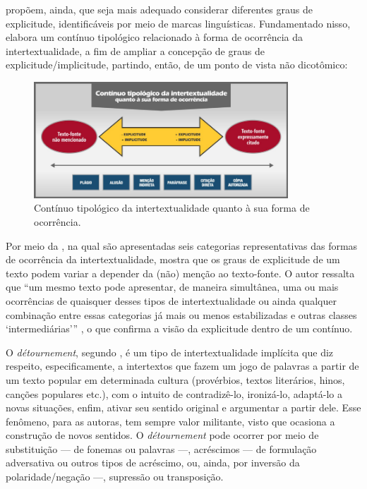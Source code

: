 \documentclass{textolivre}
\begin{document}
\textcite{koch_intertextualidade:_2012} propõem, ainda, que seja mais adequado considerar diferentes graus de explicitude, identificáveis por meio de marcas linguísticas. Fundamentado nisso, \textcite{mozdzenski_intertextualidade_2013} elabora um contínuo tipológico relacionado à forma de ocorrência da intertextualidade, a fim de ampliar a concepção de graus de explicitude/implicitude, partindo, então, de um ponto de vista não dicotômico:

\begin{figure}[htbp]
 \centering
 \includegraphics[width=0.85\textwidth]{Fig1.png}
 \caption{Contínuo tipológico da intertextualidade quanto à sua forma de ocorrência.}
 \label{fig01}
\end{figure}

Por meio da , na qual são apresentadas seis categorias representativas das formas de ocorrência da intertextualidade, \textcite{mozdzenski_intertextualidade_2013} mostra que os graus de explicitude de um texto podem variar a depender da (não) menção ao texto-fonte. O autor ressalta que “um mesmo texto pode apresentar, de maneira simultânea, uma ou mais ocorrências de quaisquer desses tipos de intertextualidade ou ainda qualquer combinação entre essas categorias já mais ou menos estabilizadas e outras classes ‘intermediárias’” \cite[p. 184]{mozdzenski_intertextualidade_2013}, o que confirma a visão da explicitude dentro de um contínuo. 

O \textit{détournement}, segundo \textcite{koch_intertextualidade:_2012}, é um tipo de intertextualidade implícita que diz respeito, especificamente, a intertextos que fazem um jogo de palavras a partir de um texto popular em determinada cultura (provérbios, textos literários, hinos, canções populares etc.), com o intuito de contradizê-lo, ironizá-lo, adaptá-lo a novas situações, enfim, ativar seu sentido original e argumentar a partir dele. Esse fenômeno, para as autoras, tem sempre valor militante, visto que ocasiona a construção de novos sentidos. O \textit{détournement} pode ocorrer por meio de substituição — de fonemas ou palavras —, acréscimos — de formulação adversativa ou outros tipos de acréscimo, ou, ainda, por inversão da polaridade/negação —, supressão ou transposição.
\end{document}
